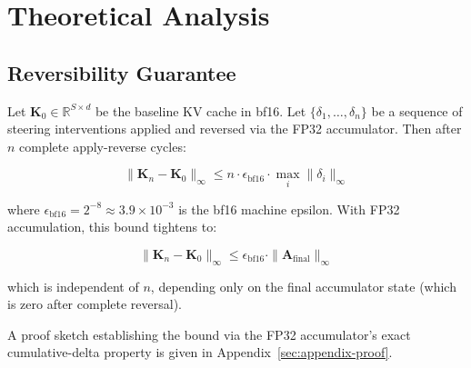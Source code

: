 \section{Theoretical Analysis}

\subsection{Reversibility Guarantee}

\begin{theorem}
\label{thm:reversibility}
Let $\mathbf{K}_0 \in \mathbb{R}^{S \times d}$ be the baseline KV cache in bf16. Let $\{\delta_1, \ldots, \delta_n\}$ be a sequence of steering interventions applied and reversed via the FP32 accumulator. Then after $n$ complete apply-reverse cycles:

\begin{equation}
\|\mathbf{K}_n - \mathbf{K}_0\|_\infty \leq n \cdot \epsilon_{\text{bf16}} \cdot \max_i \|\delta_i\|_\infty
\label{eq:reversibility_naive}
\end{equation}

where $\epsilon_{\text{bf16}} = 2^{-8} \approx 3.9 \times 10^{-3}$ is the bf16 machine epsilon. With FP32 accumulation, this bound tightens to:

\begin{equation}
\|\mathbf{K}_n - \mathbf{K}_0\|_\infty \leq \epsilon_{\text{bf16}} \cdot \|\mathbf{A}_{\text{final}}\|_\infty
\label{eq:reversibility_fp32}
\end{equation}

which is independent of $n$, depending only on the final accumulator state (which is zero after complete reversal).
\end{theorem}

A proof sketch establishing the bound via the FP32 accumulator's exact cumulative-delta property is given in Appendix~\ref{sec:appendix-proof}.

